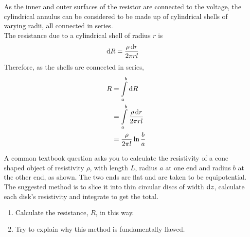 \documentclass[fleqn, a4paper, 8pt, twoside]{amsart}
\theoremstyle{definition}
\theoremstyle{theorem}
\begin{document}
\begin{multicols}{2}
\begin{spacing}{0.6}
\begin{solution}
	As the inner and outer surfaces of the resistor are connected to the voltage, the cylindrical annulus can be considered to be made up of cylindrical shells of varying radii, all connected in series.\\
	The resistance due to a cylindrical shell of radius $r$ is
	\begin{align*}
		\dif R & = \frac{\rho \dif r}{2 \pi r l}
	\end{align*}
	Therefore, as the shells are connected in series,
	\begin{align*}
		R & = \int\limits_{a}^{b} \dif R                        \\
                  & = \int\limits_{a}^{b} \frac{\rho \dif r}{2 \pi r l} \\
                  & = \frac{\rho}{2 \pi l} \ln \frac{b}{a}
	\end{align*}
\end{solution}

\begin{question}
	A common textbook question asks you to calculate the resistivity of a cone shaped object of resistivity $\rho$, with length $L$, radius $a$ at one end and radius $b$ at the other end, as shown.
	The two ends are flat and are taken to be equipotential.
	The suggested method is to slice it into thin circular discs of width $\dif z$, calculate each disk's resistivity and integrate to get the total.
	\begin{figure}[H]
	\end{figure}
	\begin{enumerate}
		\item Calculate the resistance, $R$, in this way.
		\item Try to explain why this method is fundamentally flawed.
	\end{enumerate}
\end{question}


\end{spacing}
\end{multicols}
\end{document}
